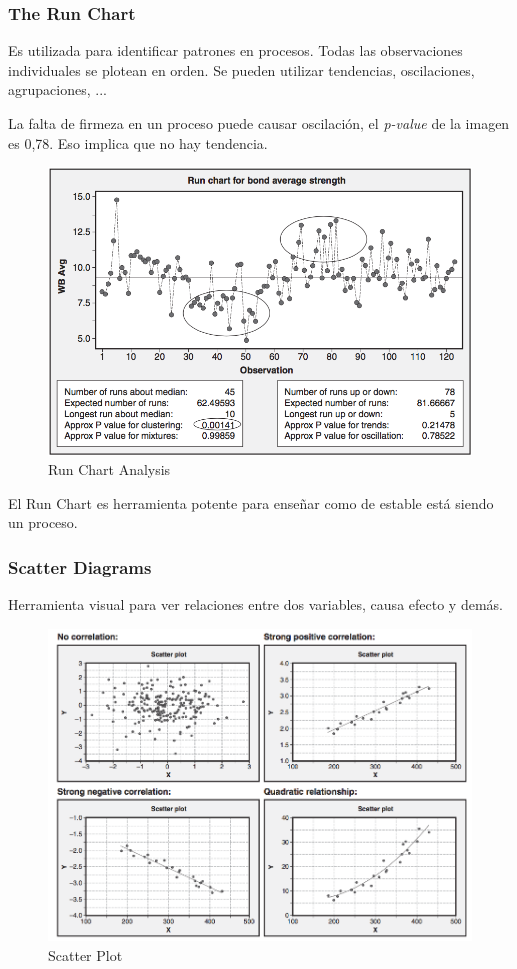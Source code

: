 \documentclass[]{article}
\begin{document}
\subsubsection{The Run Chart}

Es utilizada para identificar patrones en procesos. Todas las observaciones individuales se plotean en orden. Se pueden utilizar tendencias, oscilaciones, agrupaciones, ... 

La falta de firmeza en un proceso puede causar oscilación, el \textit{p-value} de la imagen es 0,78. Eso implica que no hay tendencia.

\begin{figure}[H]
	\centering
	\includegraphics[width=120mm]{imagenes/Run-Chart-Analysis.png}
	\caption{Run Chart Analysis}
	\label{fig:Run-Chart-Analysis}
\end{figure}

El Run Chart es herramienta potente para enseñar como de estable está siendo un proceso.

\subsubsection{Scatter Diagrams}

Herramienta visual para ver relaciones entre dos variables, causa efecto y demás. 

\begin{figure}[H]
	\centering
	\includegraphics[width=120mm]{imagenes/ScatterPlot.png}
	\caption{Scatter Plot}
	\label{fig:ScatterPlot}
\end{figure}
\end{document}
